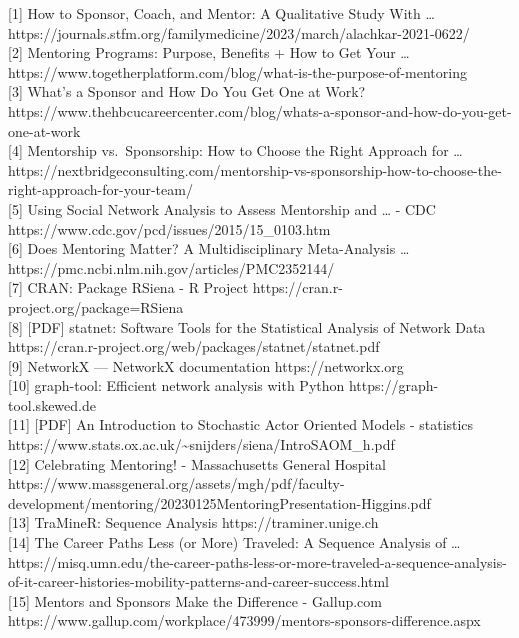 \documentclass[
  letterpaper,
  DIV=11,
  numbers=noendperiod]{scrartcl}
\begin{document}
{[}1{]} How to Sponsor, Coach, and Mentor: A Qualitative Study With
\ldots{}
https://journals.stfm.org/familymedicine/2023/march/alachkar-2021-0622/\\
{[}2{]} Mentoring Programs: Purpose, Benefits + How to Get Your \ldots{}
https://www.togetherplatform.com/blog/what-is-the-purpose-of-mentoring\\
{[}3{]} What's a Sponsor and How Do You Get One at Work?
https://www.thehbcucareercenter.com/blog/whats-a-sponsor-and-how-do-you-get-one-at-work\\
{[}4{]} Mentorship vs.~Sponsorship: How to Choose the Right Approach for
\ldots{}
https://nextbridgeconsulting.com/mentorship-vs-sponsorship-how-to-choose-the-right-approach-for-your-team/\\
{[}5{]} Using Social Network Analysis to Assess Mentorship and \ldots{}
- CDC https://www.cdc.gov/pcd/issues/2015/15\_0103.htm\\
{[}6{]} Does Mentoring Matter? A Multidisciplinary Meta-Analysis
\ldots{} https://pmc.ncbi.nlm.nih.gov/articles/PMC2352144/\\
{[}7{]} CRAN: Package RSiena - R Project
https://cran.r-project.org/package=RSiena\\
{[}8{]} {[}PDF{]} statnet: Software Tools for the Statistical Analysis
of Network Data
https://cran.r-project.org/web/packages/statnet/statnet.pdf\\
{[}9{]} NetworkX --- NetworkX documentation https://networkx.org\\
{[}10{]} graph-tool: Efficient network analysis with Python
https://graph-tool.skewed.de\\
{[}11{]} {[}PDF{]} An Introduction to Stochastic Actor Oriented Models -
statistics
https://www.stats.ox.ac.uk/\textasciitilde snijders/siena/IntroSAOM\_h.pdf\\
{[}12{]} Celebrating Mentoring! - Massachusetts General Hospital
https://www.massgeneral.org/assets/mgh/pdf/faculty-development/mentoring/20230125MentoringPresentation-Higgins.pdf\\
{[}13{]} TraMineR: Sequence Analysis https://traminer.unige.ch\\
{[}14{]} The Career Paths Less (or More) Traveled: A Sequence Analysis
of \ldots{}
https://misq.umn.edu/the-career-paths-less-or-more-traveled-a-sequence-analysis-of-it-career-histories-mobility-patterns-and-career-success.html\\
{[}15{]} Mentors and Sponsors Make the Difference - Gallup.com
https://www.gallup.com/workplace/473999/mentors-sponsors-difference.aspx\\
\end{document}
